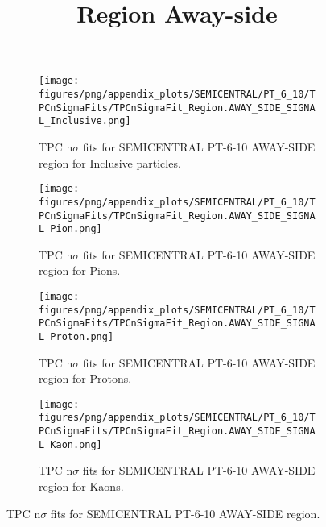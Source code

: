             \begin{figure}[H]
                \title{Region Away-side}
                \begin{subfigure}[b]{0.5\textwidth}
                    \centering
                    \texttt{[image: figures/png/appendix\_plots/SEMICENTRAL/PT\_6\_10/TPCnSigmaFits/TPCnSigmaFit\_Region.AWAY\_SIDE\_SIGNAL\_Inclusive.png]}
                    \caption{TPC n$\sigma$ fits for SEMICENTRAL PT-6-10 AWAY-SIDE region for Inclusive particles.}
                    \label{fig:appendix_SEMICENTRAL_PT-6-10_AWAY_SIDE_SIGNAL_Inclusive}
                \end{subfigure}
                \begin{subfigure}[b]{0.5\textwidth}
                    \centering
                    \texttt{[image: figures/png/appendix\_plots/SEMICENTRAL/PT\_6\_10/TPCnSigmaFits/TPCnSigmaFit\_Region.AWAY\_SIDE\_SIGNAL\_Pion.png]}
                    \caption{TPC n$\sigma$ fits for SEMICENTRAL PT-6-10 AWAY-SIDE region for Pions.}
                    \label{fig:appendix_SEMICENTRAL_PT-6-10_AWAY_SIDE_SIGNAL_Pion}
                \end{subfigure}
                \begin{subfigure}[b]{0.5\textwidth}
                    \centering
                    \texttt{[image: figures/png/appendix\_plots/SEMICENTRAL/PT\_6\_10/TPCnSigmaFits/TPCnSigmaFit\_Region.AWAY\_SIDE\_SIGNAL\_Proton.png]}
                    \caption{TPC n$\sigma$ fits for SEMICENTRAL PT-6-10 AWAY-SIDE region for Protons.}
                    \label{fig:appendix_SEMICENTRAL_PT-6-10_AWAY_SIDE_SIGNAL_Proton}
                \end{subfigure}
                \begin{subfigure}[b]{0.5\textwidth}
                    \centering
                    \texttt{[image: figures/png/appendix\_plots/SEMICENTRAL/PT\_6\_10/TPCnSigmaFits/TPCnSigmaFit\_Region.AWAY\_SIDE\_SIGNAL\_Kaon.png]}
                    \caption{TPC n$\sigma$ fits for SEMICENTRAL PT-6-10 AWAY-SIDE region for Kaons.}
                    \label{fig:appendix_SEMICENTRAL_PT-6-10_AWAY_SIDE_SIGNAL_Kaon}
                \end{subfigure}
                \caption{TPC n$\sigma$ fits for SEMICENTRAL PT-6-10 AWAY-SIDE region.}
                \label{fig:appendix_SEMICENTRAL_PT-6-10_AWAY_SIDE_SIGNAL}
            \end{figure}
